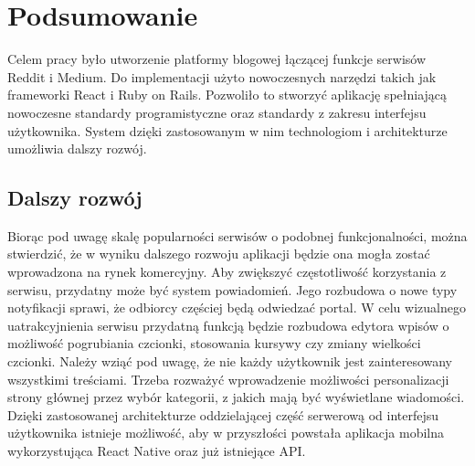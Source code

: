 \documentclass[declaration,shortabstract,polish,inz]{iithesis}
\begin{document}
\chapter{Podsumowanie}
Celem pracy było utworzenie platformy blogowej łączącej funkcje serwisów Reddit i Medium. Do implementacji użyto nowoczesnych narzędzi takich jak frameworki React i Ruby on Rails. Pozwoliło to stworzyć aplikację spełniającą nowoczesne standardy programistyczne oraz standardy z zakresu interfejsu użytkownika. System dzięki zastosowanym w nim technologiom i architekturze umożliwia dalszy rozwój.

\section{Dalszy rozwój}

Biorąc pod uwagę skalę popularności serwisów o podobnej funkcjonalności, można stwierdzić, że w wyniku dalszego rozwoju aplikacji będzie ona mogła zostać wprowadzona na rynek komercyjny. Aby zwiększyć częstotliwość korzystania z serwisu, przydatny może być system powiadomień. Jego rozbudowa o nowe typy notyfikacji sprawi, że odbiorcy częściej będą odwiedzać portal. W celu wizualnego uatrakcyjnienia serwisu przydatną funkcją będzie rozbudowa edytora wpisów o możliwość pogrubiania czcionki, stosowania kursywy czy zmiany wielkości czcionki. Należy wziąć pod uwagę, że nie każdy użytkownik jest zainteresowany wszystkimi treściami. Trzeba rozważyć wprowadzenie możliwości personalizacji strony głównej przez wybór kategorii, z jakich mają być wyświetlane wiadomości. Dzięki zastosowanej architekturze oddzielającej część serwerową od interfejsu użytkownika istnieje możliwość, aby w przyszłości powstała aplikacja mobilna wykorzystująca React Native oraz już istniejące API.


\end{document}
